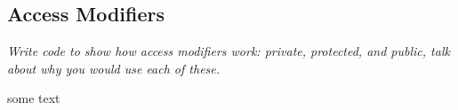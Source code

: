 \subsection{Access Modifiers}
\textit{Write code to show how access modifiers work: private, protected, and public, talk about why you would use each of these.}

some text



